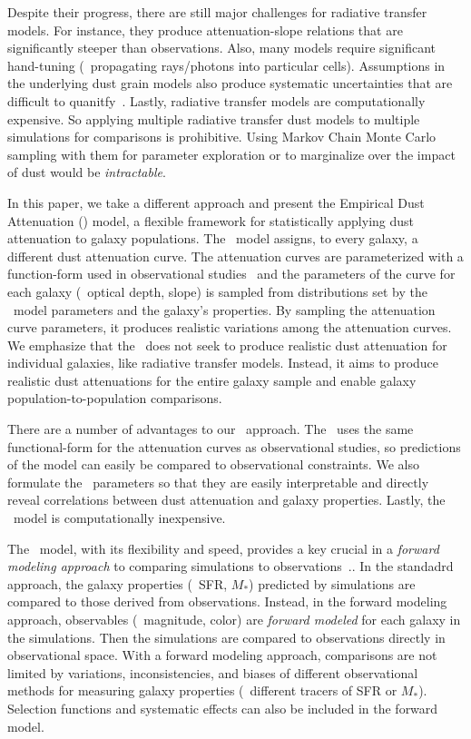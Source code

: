 Despite their progress, there are still major challenges for radiative
transfer models. For instance, they produce attenuation-slope relations that
are significantly steeper than observations. Also, %
many models require significant hand-tuning (\eg~propagating rays/photons into
particular cells). Assumptions in the underlying dust grain models also produce
systematic uncertainties that are difficult to quanitfy~\citep[see][for a
review]{steinacker2013}. Lastly, radiative transfer models 
are computationally expensive. So applying multiple radiative transfer dust
models to multiple simulations for comparisons is prohibitive. Using Markov
Chain Monte Carlo sampling with them for parameter exploration or to marginalize
over the impact of dust would be {\em intractable}. 

In this paper, we take a different approach and present the Empirical Dust
Attenuation (\eda) model, a flexible framework for statistically applying dust
attenuation to galaxy populations. The \eda~model assigns, to every galaxy, a
different dust attenuation curve. The attenuation curves are parameterized with
a function-form used in observational studies~\citep{noll2009} and the
parameters of the curve for each galaxy (\eg~optical depth, slope) is sampled
from distributions set by the \eda~model parameters and the galaxy's properties.  
By sampling the attenuation curve parameters, it produces realistic variations 
among the attenuation curves. We emphasize that the \eda~does not seek to produce 
realistic dust attenuation for individual galaxies, like radiative transfer
models. Instead, it aims to produce realistic dust attenuations for the entire
galaxy sample and enable galaxy population-to-population comparisons.

There are a number of advantages to our \eda~approach. The \eda~uses the same
functional-form for the attenuation curves as observational studies, so
predictions of the model can easily be compared to observational constraints. 
We also formulate the \eda~parameters so that they are easily interpretable and
directly reveal correlations between dust attenuation and galaxy properties.
Lastly, the \eda~model is computationally inexpensive. 

The \eda~model, with its flexibility and speed, provides a key crucial in a
{\em forward modeling approach} to comparing simulations to
observations~\citep[\eg][]{nelson2018, baes2019, trcka2020, dickey2020}..
In the standadrd approach, the galaxy properties (\eg~SFR, $M_*$) predicted by
simulations are compared to those derived from observations. Instead, in the
forward modeling approach, observables (\eg~magnitude, color) are {\em forward
modeled} for each galaxy in the simulations. Then the simulations are compared 
to observations directly in observational space. With a forward modeling approach, 
comparisons are not limited by variations, inconsistencies, and biases of different
observational methods for measuring galaxy properties (\eg~different tracers of
SFR or $M_*$). Selection functions and systematic effects can also be included 
in the forward model. 

